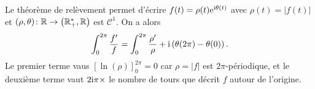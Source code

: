 \begin{remark}
    Le théorème de relèvement permet d'écrire $f(t)=\rho(t)\mathrm{e}^{\mathrm{i}\theta(t)}$ avec $\rho(t)=\left\lvert f(t)\right\rvert$ et $(\rho,\theta)\colon\mathbb{R}\to\left(\mathbb{R}_{+}^{*},\mathbb{R}\right)$ est $\mathcal{C}^{1}$. On a alors 
    \begin{equation}
        \int_{0}^{2\pi}\frac{f'}{f}=\int_{0}^{2\pi}\frac{\rho'}{\rho}+\mathrm{i}\left(\theta(2\pi)-\theta(0)\right).
    \end{equation}
    Le premier terme vaus $\left[\ln(\rho)\right]_{0}^{2\pi}=0$ car $\rho=\left\lvert f\right\rvert$ est $2\pi$-périodique, et le deuxième terme vaut $2\mathrm{i}\pi\times$ le nombre de tours que décrit $f$ autour de l'origine.
\end{remark}